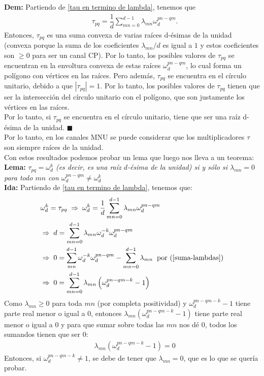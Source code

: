 \textbf{Dem:} Partiendo de \ref{tau en termino de lambda}, tenemos que
\begin{align*}
& \tau_{pq} = \dfrac{1}{d} \sum_{mn=0}^{d-1} \lambda_{mn} \omega_d^{pn-qm} .
\end{align*}
Entonces, $\tau_{pq}$ es una suma convexa de varias raíces d-ésimas 
de la unidad (convexa porque la suma de los coeficientes $\lambda_{mn}/d$ es igual a $1$ y estos coeficientes son $\geq 0$ para ser un canal CP). 
Por lo tanto, los posibles valores de $\tau_{pq}$ se encuentran 
en la envoltura convexa de estas raíces $\omega_d^{pn-qm}$,
lo cual forma un polígono con vértices en las raíces. 
Pero además, $\tau_{pq}$ se encuentra en el círculo unitario, debido a que $|\tau_{pq}| = 1$. 
Por lo tanto, los posibles  valores de $\tau_{pq}$ tienen que ser la intersección
del círculo unitario con el polígono, que son justamente los vértices en las raíces. \\
Por lo tanto, si $\tau_{pq}$ se encuentra en el círculo unitario, 
tiene que ser una raíz d-ésima de la unidad.  $ \blacksquare$  \\

Por lo tanto, en los canales MNU se puede considerar 
que los multiplicadores $\tau$ son siempre raíces de la unidad. \\

Con estos resultados podemos probar un lema que luego nos lleva a un teorema:\\




\textbf{Lema:} \textit{$\tau_{pq} = \omega_d^k$ (es decir, es una raíz $d$-ésima de la unidad) si  y sólo si $\lambda_{mn} = 0$ para todo $mn$ con $\omega_d^{pn-qm} \neq \omega_d^k$} \\

\textbf{Ida:}  Partiendo de \ref{tau en termino de lambda}, tenemos que:
\begin{align*}
& \omega_d^k = \tau_{pq}  \; \Rightarrow \; \omega_d^k = \dfrac{1}{d} \sum_{mn=0}^{d-1} \lambda_{mn} \omega_d^{pn-qm} \\
& \Rightarrow \; d = \sum_{mn=0}^{d-1} \lambda_{mn} \omega_d^{-k} \omega_d^{pn-qm} \\
& \Rightarrow \; 0 = \sum_{mn}^{d-1} \omega_d^{-k} \omega_d^{pn-qm} - \sum_{mn=0}^{d-1}\lambda_{mn} \;\; \text{por (\ref{suma-lambdas})} \\
& \Rightarrow \; 0 = \sum_{mn=0}^{d-1} \lambda_{mn} \left( \omega_d^{pn-qm-k} - 1 \right) 
\end{align*}
Como $\lambda_{mn} \geq 0$ para toda $mn$ (por completa positividad) y $\omega_d^{pn-qm-k} - 1$ tiene parte real menor o igual a $0$, entonces $\lambda_{mn} \left( \omega_d^{pn-qm-k} - 1 \right) $ tiene parte real menor o igual a $0$ y para que sumar sobre todas las $mn$ nos dé $0$, todos los sumandos tienen que ser $0$:
\begin{align*}
& \lambda_{mn} \left( \omega_d^{pn-qm-k} - 1 \right) = 0
\end{align*}
Entonces, si $\omega_d^{pn-qm-k} \neq 1$, se debe de tener que $\lambda_{mn} = 0$, que es lo que se quería probar. \\

